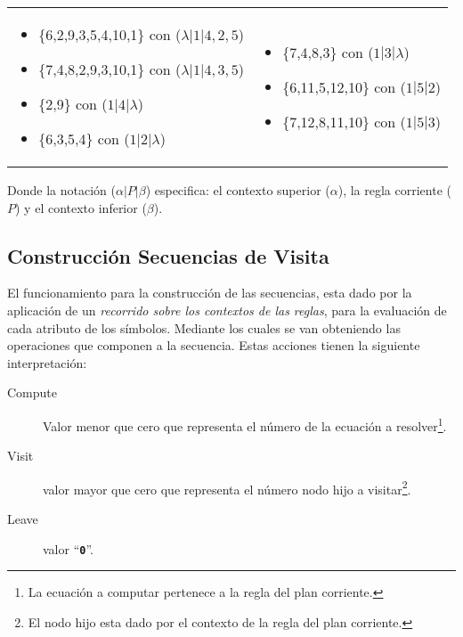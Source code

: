 \documentclass[runningheads,a4paper]{llncs}
\newcommand{\textbtt}[1]{\texttt{\textbf{#1}}}
\begin{document}
\begin{tabular}{p{6cm}p{6cm}}
\begin{itemize}
\item \{6,2,9,3,5,4,10,1\} con ($\lambda| 1 | 4,2,5$)
\item \{7,4,8,2,9,3,10,1\} con ($\lambda| 1 | 4,3,5$)
\item \{2,9\} con  ($1 | 4 | \lambda$)
\item \{6,3,5,4\} con  ($ 1 | 2 | \lambda$)
\end{itemize}&
\begin{itemize}
\item \{7,4,8,3\} con  ($ 1 | 3 | \lambda$)
\item \{6,11,5,12,10\} con  ($ 1 | 5 | 2$)
\item \{7,12,8,11,10\} con  ($ 1 | 5 | 3$)
\end{itemize}\\
\end{tabular}

Donde la notación ($\alpha | P | \beta$) especifica: el contexto superior ($\alpha$), la regla corriente ($P$) y el contexto inferior ($\beta$).

\subsection{Construcción Secuencias de Visita}
\label{seubsec:seq-visit}
\vspace{-0.22cm}
El funcionamiento para la construcción de las secuencias, esta dado por la aplicación de un \textit{recorrido sobre los contextos de las reglas}, para la evaluación de cada atributo de los símbolos. %
Mediante los cuales se van obteniendo las operaciones que componen a la secuencia. Estas acciones tienen la siguiente interpretación: 

\begin{description}
\item [Compute] Valor menor que cero que representa el número de la ecuación a resolver\footnote{La ecuación a computar pertenece a la regla del plan corriente.}.
\item [Visit] valor mayor que cero que representa el número nodo hijo a visitar\footnote{El nodo hijo esta dado por el contexto de la regla del plan corriente.}.
\item [Leave] valor ``\textbtt{0}''.
\end{description}
\end{document}
